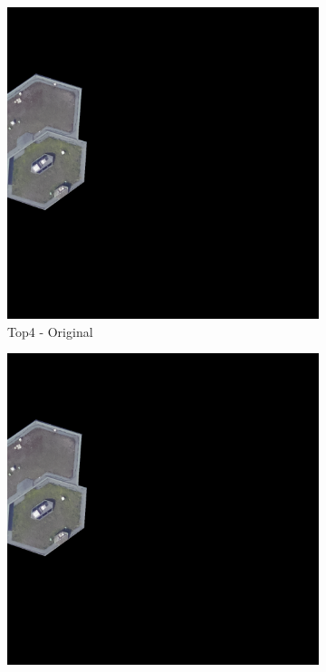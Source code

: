 \begin{figure}[H]
\begin{subfigure}{0.32\textwidth}
    \includegraphics[width=\textwidth]{02-main//figures/ch4/kfold_ensembles/linknet_timm-efficientnet-b5/worst_cases/worst_2_iou0.000_25001117_tile_3_9_5ba8f7_original.png}
    \caption{Top4 - Original}
\end{subfigure}
\hfill
\begin{subfigure}{0.32\textwidth}
    \includegraphics[width=\textwidth]{02-main//figures/ch4/kfold_ensembles/linknet_timm-efficientnet-b5/worst_cases/worst_2_iou0.000_25001117_tile_3_9_5ba8f7_overlay_gt.png}

\end{subfigure}
\end{figure}
